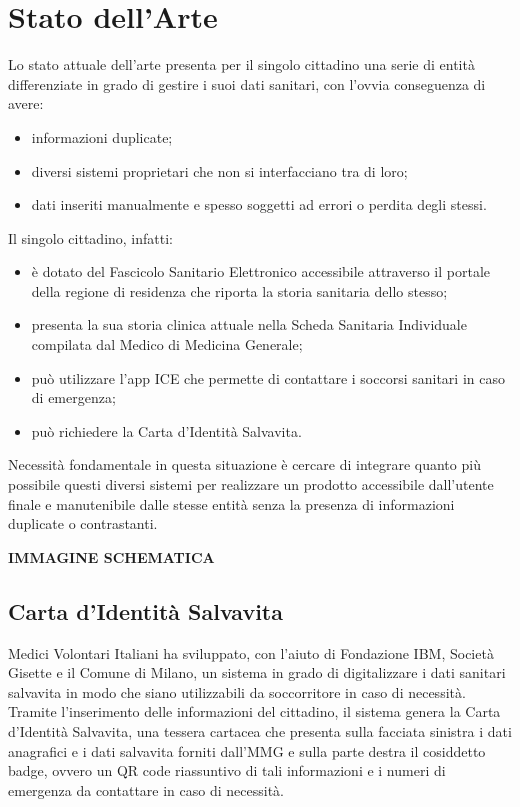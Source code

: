\documentclass[12pt,a4paper,twoside,openright,titlepage]{book}
\begin{document}
\section{Stato dell'Arte}
Lo stato attuale dell'arte presenta per il singolo cittadino una serie di entità differenziate in grado di gestire i suoi dati sanitari, con l'ovvia conseguenza di avere:
\begin{itemize}
\item informazioni duplicate;
\item diversi sistemi proprietari che non si interfacciano tra di loro;
\item dati inseriti manualmente e spesso soggetti ad errori o perdita degli stessi.
\end{itemize}
Il singolo cittadino, infatti:
\begin{itemize}
\item è dotato del Fascicolo Sanitario Elettronico accessibile attraverso il portale della regione di residenza che riporta la storia sanitaria dello stesso;
\item presenta la sua storia clinica attuale nella Scheda Sanitaria Individuale compilata dal Medico di Medicina Generale;
\item può utilizzare l'app ICE che permette di contattare i soccorsi sanitari in caso di emergenza;
\item può richiedere la Carta d'Identità Salvavita.
\end{itemize}
Necessità fondamentale in questa situazione è cercare di integrare quanto più possibile questi diversi sistemi per realizzare un prodotto accessibile dall'utente finale e manutenibile dalle stesse entità senza la presenza di informazioni duplicate o contrastanti.\newline

\textbf{IMMAGINE SCHEMATICA}

\subsection{Carta d'Identità Salvavita}
Medici Volontari Italiani ha sviluppato, con l'aiuto di Fondazione IBM, Società Gisette e il Comune di Milano, un sistema in grado di digitalizzare i dati sanitari salvavita in modo che siano utilizzabili da soccorritore in caso di necessità. Tramite l'inserimento delle informazioni del cittadino, il sistema genera la Carta d'Identità Salvavita, una tessera cartacea che presenta sulla facciata sinistra i dati anagrafici e i dati salvavita forniti dall'MMG e sulla parte destra il cosiddetto badge, ovvero un QR code riassuntivo di tali informazioni e i numeri di emergenza da contattare in caso di necessità.
\end{document}
